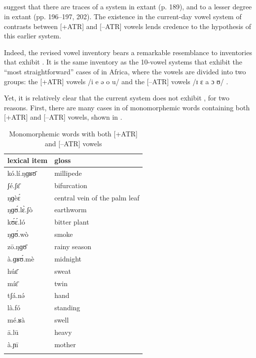 \documentclass[output=paper,colorlinks,citecolor=brown]{langscibook}
\begin{document}
\subsection{}

\citeauthor{BoyeldieuCloarec-Heiss2001} suggest that there are traces of a   system in extant  (p. 189), and to a lesser degree in extant  (pp. 196–197, 202). The existence in the current-day  vowel system of contrasts between [+ATR] and [–ATR] vowels lends credence to the hypothesis of this earlier  system.

Indeed, the revised  vowel inventory bears a remarkable resemblance to inventories that exhibit . It is the same inventory as the 10-vowel systems that exhibit the “most straightforward” cases of  in Africa, where the vowels are divided into two groups: the [+ATR] vowels /i e ə o u/ and the [–ATR] vowels /ɪ ɛ a ɔ ʊ/ \citep[499]{Casali2008}.

Yet, it is relatively clear that the current  system does not exhibit , for two reasons. First, there are many cases in  of monomorphemic words containing both [+ATR] and [–ATR] vowels, shown in .

\begin{table}
\caption{Monomorphemic words with both [+ATR] and [–ATR] vowels}
\label{tab:olson:15}
    \begin{tabular}{ll}
    \lsptoprule
        lexical item & gloss\\
    \midrule
        kó.lí.ŋɡʁʊ̄ & millipede\\
        ʃé.ʃɛ̄ & bifurcation\\
        ŋɡèɛ́ & central vein of the palm leaf\\
        ŋɡʊ́.lɛ̀.ʃò & earthworm\\
        kʊ́ɛ́.ló & bitter plant\\
        ŋɡʊ́.wò & smoke\\
        zō.ŋɡʊ̄ & rainy season\\
        à.ɡʁʊ́.mè & midnight\\
        húɛ̄ & sweat\\
        míɛ̄ & twin\\
        tʃá.nə́ & hand\\
        là.fó & standing\\
        mé.ʁà & swell\\
        ā.lū & heavy\\
        à.ɲī & mother\\
    \lspbottomrule
    \end{tabular}
\end{table}
\end{document}
